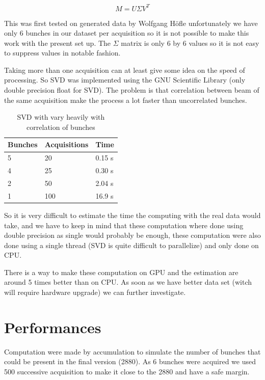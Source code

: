 $$M = U \Sigma V^{T}$$ 

This was first tested on generated data by Wolfgang H{\"o}f\/le\cite{HofleEvian10} unfortunately we have only 6 bunches in our dataset per acquisition so it is not possible to make this work with the present set up. The $\Sigma$ matrix is only 6 by 6 values so it is not easy to suppress values in notable fashion.

Taking more than one acquisition can at least give some idea on the speed of processing. So SVD was implemented using the GNU Scientific Library (only double precision float for SVD). The problem is that correlation between beam of the same acquisition make the process a lot faster than uncorrelated bunches.

\begin{table}[H]
	\caption{SVD with vary heavily with correlation of bunches}
	\label{tab:SVD}
	\centering
	\begin{tabular}{|l|l|l|}
		\hline
			Bunches & Acquisitions & Time \\
		\hline
			5 & 20 & 0.15 s \\
			4 & 25 & 0.30 s \\
			2 & 50 & 2.04 s \\
			1 & 100 & 16.9 s \\
		\hline
	\end{tabular}
\end{table}

So it is very difficult to estimate the time the computing with the real data would take, and we have to keep in mind that these computation where done using double precision as single would probably be enough, these computation were also done using a single thread (SVD is quite difficult to parallelize) and only done on \gls{CPU}.

There is a way to make these computation on \gls{GPU}\cite{Lahabar09} and the estimation are around 5 times better than on \gls{CPU}. As soon as we have better data set (witch will require hardware upgrade) we can further investigate.

\section{Performances}
\label{sec:perf}

Computation were made by accumulation to simulate the number of bunches that could be present in the final version (2880). As 6 bunches were acquired we used 500 successive acquisition to make it close to the 2880 and have a safe margin.

